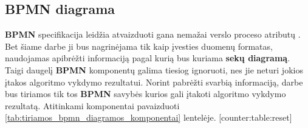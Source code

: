 \documentclass{VUMIFInfBakalaurinis}
\begin{document}
\subsection{BPMN diagrama}
\textbf{BPMN} specifikacija leidžia atvaizduoti gana nemažai verslo proceso atributų \cite{bpmnFormal}. Bet šiame darbe ji bus nagrinėjama tik kaip įvesties duomenų formatas, naudojamas apibrėžti informaciją pagal kurią bus kuriama \textbf{sekų diagramą}. Taigi daugelį \textbf{BPMN} komponentų galima tiesiog ignoruoti, nes jie neturi jokios įtakos algoritmo vykdymo rezultatui. Norint pabrėžti svarbią informaciją, darbe bus tiriamos tik tos \textbf{BPMN} savybės kurios gali įtakoti algoritmo vykdymo rezultatą. Atitinkami komponentai pavaizduoti \ref{tab:tiriamos_bpmn_diagramos_komponentai} lentelėje.
[counter:table:reset]
\newcommand\rownumber{\stepcounter{counter:table}\arabic{counter:table}}
\end{document}
